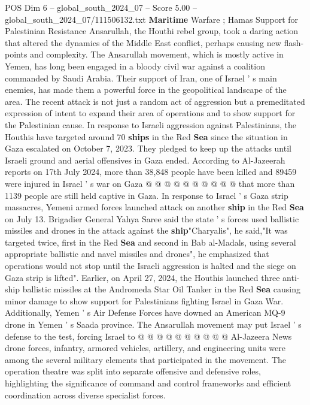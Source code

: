 \begin{textsample}{POS Dim 6 – global\_south\_2024\_07 – Score 5.00 – global\_south\_2024\_07/111506132.txt}  \label{ex:f6_pos_320}
\textbf{Maritime} Warfare ; Hamas Support for Palestinian Resistance Ansarullah, the Houthi rebel group, took a daring action that altered the dynamics of the Middle East conflict, perhaps causing new flash-points and complexity.
The Ansarullah movement, which is mostly active in Yemen, has long been engaged in a bloody civil war against a coalition commanded by Saudi Arabia.
Their support of Iran, one of Israel ' s main enemies, has made them a powerful force in the geopolitical landscape of the area.
The recent attack is not just a random act of aggression but a premeditated expression of intent to expand their area of operations and to show support for the Palestinian cause.
In response to Israeli aggression against Palestinians, the Houthis have targeted around 70 \textbf{ships} in the Red \textbf{Sea} since the situation in Gaza escalated on October 7, 2023.
They pledged to keep up the attacks until Israeli ground and aerial offensives in Gaza ended.
According to Al-Jazeerah reports on 17th July 2024, more than 38,848 people have been killed and 89459 were injured in Israel ' s war on Gaza @ @ @ @ @ @ @ @ @ @ that more than 1139 people are still held captive in Gaza.
In response to Israel ' s Gaza strip massacres, Yemeni armed forces launched attack on another \textbf{ship} in the Red \textbf{Sea} on July 13.
Brigadier General Yahya Saree said the state ' s forces used ballistic missiles and drones in the attack against the \textbf{ship}"Charyalis", he said,"It was targeted twice, first in the Red \textbf{Sea} and second in Bab al-Madals, using several appropriate ballistic and navel missiles and drones", he emphasized that operations would not stop until the Israeli aggression is halted and the siege on Gaza strip is lifted".
Earlier, on April 27, 2024, the Houthis launched three anti-ship ballistic missiles at the Andromeda Star Oil Tanker in the Red \textbf{Sea} causing minor damage to show support for Palestinians fighting Israel in Gaza War.
Additionally, Yemen ' s Air Defense Forces have downed an American MQ-9 drone in Yemen ' s Saada province.
The Ansarullah movement may put Israel ' s defense to the test, forcing Israel to @ @ @ @ @ @ @ @ @ @ Al-Jazeera News drone forces, infantry, armored vehicles, artillery, and engineering units were among the several military elements that participated in the movement.
The operation theatre was split into separate offensive and defensive roles, highlighting the significance of command and control frameworks and efficient coordination across diverse specialist forces.

\end{textsample}
